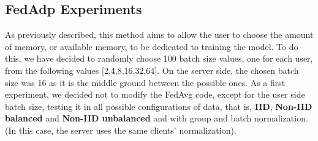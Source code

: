 \documentclass[conference]{IEEEtran}
\begin{document}
\subsection{FedAdp Experiments}
As previously described, this method aims to allow the user to choose the amount of memory, or available memory, to be dedicated to training the model. To do this, we have decided to randomly choose 100 batch size values, one for each user, from the following values [2,4,8,16,32,64]. On the server side, the chosen batch size was 16 as it is the middle ground between the possible ones. As a first experiment, we decided not to modify the FedAvg code, except for the user side batch size, testing it in all possible configurations of data, that is,\textbf{ IID}, \textbf{Non-IID balanced} and \textbf{Non-IID unbalanced} and with group and batch normalization. (In this case, the server uses the same clients' normalization).
\end{document}
